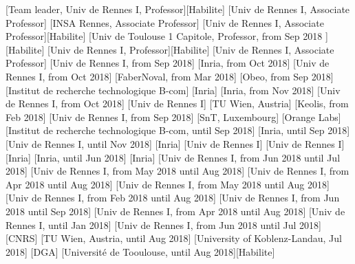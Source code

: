 \documentclass{ra2018}
\begin{document}
[Team leader, Univ de Rennes I, Professor][Habilite]
[Univ de Rennes I, Associate Professor]
[INSA Rennes, Associate Professor]
[Univ de Rennes I, Associate Professor][Habilite]
[Univ de Toulouse 1 Capitole, Professor, from Sep 2018 ][Habilite]
[Univ de Rennes I, Professor][Habilite]
[Univ de Rennes I, Associate Professor]
[Univ de Rennes I, from Sep 2018]
[Inria, from Oct 2018]
[Univ de Rennes I, from Oct 2018]
[FaberNoval, from Mar 2018]
[Obeo, from Sep 2018]
[Institut de recherche technologique B-com]
[Inria]
[Inria, from Nov 2018]
[Univ de Rennes I, from Oct 2018]
[Univ de Rennes I]
[TU Wien, Austria]
[Keolis, from Feb 2018]
[Univ de Rennes I, from Sep 2018]
[SnT, Luxembourg]
[Orange Labs]
[Institut de recherche technologique B-com, until Sep 2018]
[Inria, until Sep 2018]
[Univ de Rennes I, until Nov 2018]
[Inria]
[Univ de Rennes I]
[Univ de Rennes I]
[Inria]
[Inria, until Jun 2018]
[Inria]
[Univ de Rennes I, from Jun 2018 until Jul 2018]
[Univ de Rennes I, from May 2018 until Aug 2018]
[Univ de Rennes I, from Apr 2018 until Aug 2018]
[Univ de Rennes I, from May 2018 until Aug 2018]
[Univ de Rennes I, from Feb 2018 until Aug 2018]
[Univ de Rennes I, from Jun 2018 until Sep 2018]
[Univ de Rennes I, from Apr 2018 until Aug 2018]
[Univ de Rennes I, until Jan 2018]
[Univ de Rennes I, from Jun 2018 until Jul 2018]
[CNRS]
[TU Wien, Austria, until Aug 2018]
[University of Koblenz-Landau, Jul 2018]
[DGA]
[Université de Tooulouse, until Aug 2018][Habilite]
\end{document}
